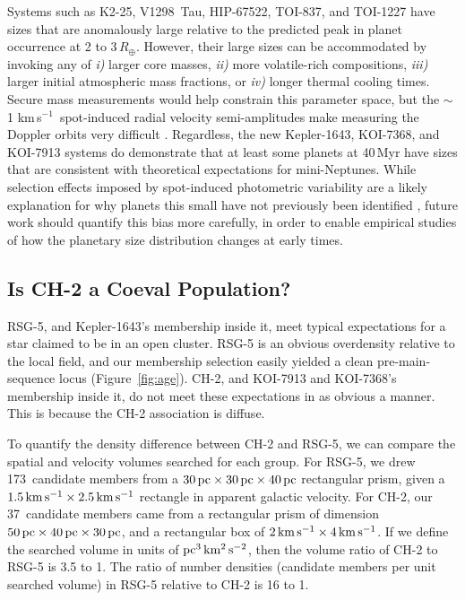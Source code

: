 \documentclass[12pt,twocolumn,tighten,linenumbers,trackchanges]{aastex63}
\newcommand{\nchtwo}{37} %
\newcommand{\nrsgfive}{173} %
\newcommand{\kms}{\,km\,s$^{-1}$}
\newcommand{\mkms}{{\rm \,km\,s^{-1}}}  %
\begin{document}
Systems such as K2-25, V1298~Tau, HIP-67522, TOI-837, and TOI-1227
have sizes that are anomalously large relative to the predicted peak
in planet occurrence at 2 to 3\,$R_\oplus$.  However, their large
sizes can be accommodated by invoking any of {\it i)} larger core
masses, {\it ii)} more volatile-rich compositions, {\it iii)}  larger
initial atmospheric mass fractions, or {\it iv)} longer thermal
cooling times.  Secure mass measurements would help constrain this
parameter space, but the $\sim$1\,\kms\ spot-induced radial velocity
semi-amplitudes make measuring the Doppler orbits very difficult
\citep[][]{cale_diving_2021,zicher_one_2022,klein_one_2022}.
Regardless, the new Kepler-1643, KOI-7368, and KOI-7913 systems do
demonstrate that at least some planets at 40\,Myr have sizes that are
consistent with theoretical expectations for mini-Neptunes.  While
selection effects imposed by spot-induced photometric variability are
a likely explanation for why planets this small have not previously
been identified \citep[{e.g.},][]{zhou_2021_tois}, future work should
quantify this bias more carefully, in order to enable empirical
studies of how the planetary size distribution changes at early times.


\subsection{Is CH-2 a Coeval Population?}
\label{subsec:ch2}

RSG-5, and Kepler-1643's membership inside it, meet typical
expectations for a star claimed to be in an open cluster.  RSG-5 is an
obvious overdensity relative to the local field, and our membership
selection easily yielded a clean pre-main-sequence locus
(Figure~\ref{fig:age}).  CH-2, and KOI-7913 and KOI-7368's membership
inside it, do not meet these expectations in as obvious a manner.
This is because the CH-2 association is diffuse.

To quantify the density difference between CH-2 and RSG-5, we can
compare the spatial and velocity volumes searched for each group.  For
RSG-5, we drew \nrsgfive\ candidate members from a $30\,{\rm
pc}\times30\,{\rm pc}\times40\,{\rm pc}$ rectangular prism, given a
$1.5 {\rm \mkms} \times 2.5 {\rm \mkms }$ rectangle in apparent
galactic velocity.  For CH-2, our \nchtwo\ candidate members came from
a rectangular prism of dimension $50\,{\rm pc}\times40\,{\rm
pc}\times30\,{\rm pc}$, and a rectangular box of $2 {\rm \mkms} \times
4 {\rm \mkms}$.  If we define the searched volume in units of ${\rm
pc}^3\,{\rm km^2}\,{\rm s^{-2}}$, then the volume ratio of CH-2 to
RSG-5 is 3.5 to 1.  The ratio of number densities (candidate members
per unit searched volume) in RSG-5 relative to CH-2 is 16 to 1.
\end{document}
